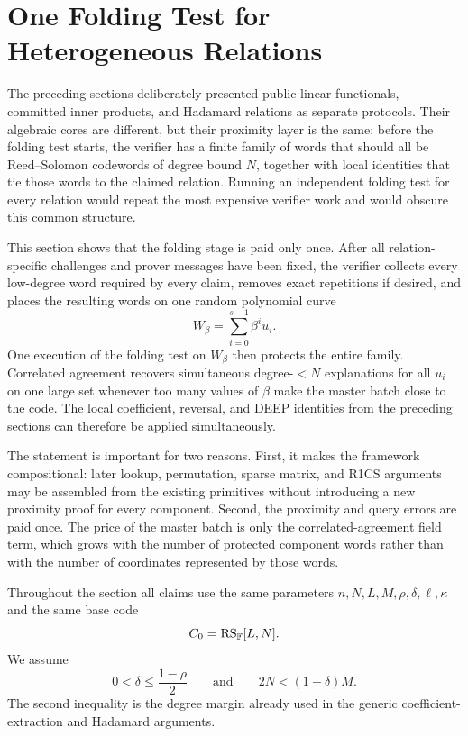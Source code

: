 \section{One Folding Test for Heterogeneous Relations}
\label{sec:heterogeneous-batching}

The preceding sections deliberately presented public linear functionals, committed inner products, and Hadamard relations as separate protocols.  Their algebraic cores are different, but their proximity layer is the same: before the folding test starts, the verifier has a finite family of words that should all be Reed--Solomon codewords of degree bound $N$, together with local identities that tie those words to the claimed relation.  Running an independent folding test for every relation would repeat the most expensive verifier work and would obscure this common structure.

This section shows that the folding stage is paid only once.  After all relation-specific challenges and prover messages have been fixed, the verifier collects every low-degree word required by every claim, removes exact repetitions if desired, and places the resulting words on one random polynomial curve
\[
  W_\beta=\sum_{i=0}^{s-1}\beta^iu_i.
\]
One execution of the folding test on $W_\beta$ then protects the entire family.  Correlated agreement recovers simultaneous degree-$<N$ explanations for all $u_i$ on one large set whenever too many values of $\beta$ make the master batch close to the code.  The local coefficient, reversal, and DEEP identities from the preceding sections can therefore be applied simultaneously.

The statement is important for two reasons.  First, it makes the framework compositional: later lookup, permutation, sparse matrix, and R1CS arguments may be assembled from the existing primitives without introducing a new proximity proof for every component.  Second, the proximity and query errors are paid once.  The price of the master batch is only the correlated-agreement field term, which grows with the number of protected component words rather than with the number of coordinates represented by those words.

Throughout the section all claims use the same parameters $n,N,L,M,\rho,\delta,\ell,\kappa$ and the same base code
\[
  C_0=\operatorname{RS}_{\mathbb{F}}[L,N].
\]
We assume
\begin{equation}
  0<\delta\le\frac{1-\rho}{2}
  \qquad\text{and}\qquad
  2N<(1-\delta)M.
  \label{eq:heterogeneous-parameters}
\end{equation}
The second inequality is the degree margin already used in the generic coefficient-extraction and Hadamard arguments.

